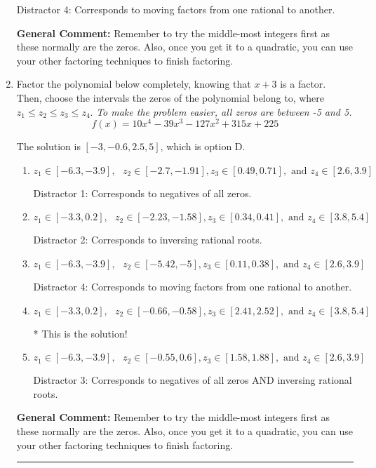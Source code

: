 \documentclass{extbook}[14pt]
\newcommand{\litem}[1]{\item #1

\rule{\textwidth}{0.4pt}}
\begin{document}
\begin{enumerate}
{\begin{enumerate}[label=\Alph*.]
 Distractor 4: Corresponds to moving factors from one rational to another.
\end{enumerate}

\textbf{General Comment:} Remember to try the middle-most integers first as these normally are the zeros. Also, once you get it to a quadratic, you can use your other factoring techniques to finish factoring.
}
\litem{
Factor the polynomial below completely, knowing that $x+3$ is a factor. Then, choose the intervals the zeros of the polynomial belong to, where $z_1 \leq z_2 \leq z_3 \leq z_4$. \textit{To make the problem easier, all zeros are between -5 and 5.}
\[ f(x) = 10x^{4} -39 x^{3} -127 x^{2} +315 x + 225 \]

The solution is \( [-3, -0.6, 2.5, 5] \), which is option D.\begin{enumerate}[label=\Alph*.]
\item \( z_1 \in [-6.3, -3.9], \text{   }  z_2 \in [-2.7, -1.91], z_3 \in [0.49, 0.71], \text{   and   } z_4 \in [2.6, 3.9] \)

 Distractor 1: Corresponds to negatives of all zeros.
\item \( z_1 \in [-3.3, 0.2], \text{   }  z_2 \in [-2.23, -1.58], z_3 \in [0.34, 0.41], \text{   and   } z_4 \in [3.8, 5.4] \)

 Distractor 2: Corresponds to inversing rational roots.
\item \( z_1 \in [-6.3, -3.9], \text{   }  z_2 \in [-5.42, -5], z_3 \in [0.11, 0.38], \text{   and   } z_4 \in [2.6, 3.9] \)

 Distractor 4: Corresponds to moving factors from one rational to another.
\item \( z_1 \in [-3.3, 0.2], \text{   }  z_2 \in [-0.66, -0.58], z_3 \in [2.41, 2.52], \text{   and   } z_4 \in [3.8, 5.4] \)

* This is the solution!
\item \( z_1 \in [-6.3, -3.9], \text{   }  z_2 \in [-0.55, 0.6], z_3 \in [1.58, 1.88], \text{   and   } z_4 \in [2.6, 3.9] \)

 Distractor 3: Corresponds to negatives of all zeros AND inversing rational roots.
\end{enumerate}

\textbf{General Comment:} Remember to try the middle-most integers first as these normally are the zeros. Also, once you get it to a quadratic, you can use your other factoring techniques to finish factoring.
}
\end{enumerate}
\end{document}
